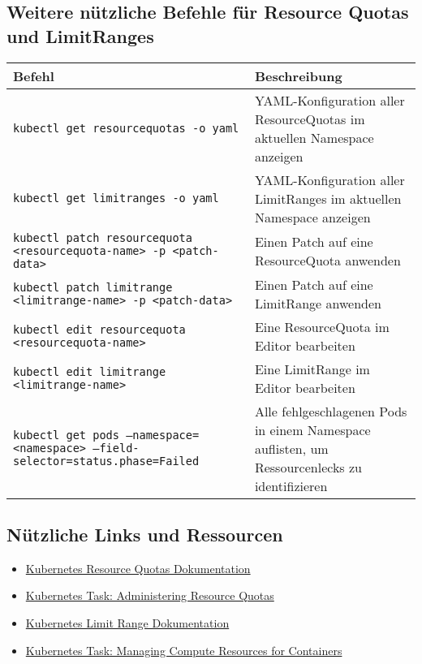 \subsection{Weitere nützliche Befehle für Resource Quotas und LimitRanges}
\begin{tabular}{|p{}|p{}|}
\hline
\textbf{Befehl} & \textbf{Beschreibung} \\
\hline
\texttt{kubectl get resourcequotas -o yaml} & YAML-Konfiguration aller ResourceQuotas im aktuellen Namespace anzeigen \\
\texttt{kubectl get limitranges -o yaml} & YAML-Konfiguration aller LimitRanges im aktuellen Namespace anzeigen \\
\texttt{kubectl patch resourcequota <resourcequota-name> -p <patch-data>} & Einen Patch auf eine ResourceQuota anwenden \\
\texttt{kubectl patch limitrange <limitrange-name> -p <patch-data>} & Einen Patch auf eine LimitRange anwenden \\
\texttt{kubectl edit resourcequota <resourcequota-name>} & Eine ResourceQuota im Editor bearbeiten \\
\texttt{kubectl edit limitrange <limitrange-name>} & Eine LimitRange im Editor bearbeiten \\
\texttt{kubectl get pods --namespace=<namespace> --field-selector=status.phase=Failed} & Alle fehlgeschlagenen Pods in einem Namespace auflisten, um Ressourcenlecks zu identifizieren \\
\hline
\end{tabular}

\subsection*{Nützliche Links und Ressourcen}
\begin{itemize}
    \item \href{https://kubernetes.io/docs/concepts/policy/resource-quotas/}{Kubernetes Resource Quotas Dokumentation}
    \item \href{https://kubernetes.io/docs/tasks/administer-cluster/quota-api-object/}{Kubernetes Task: Administering Resource Quotas}
    \item \href{https://kubernetes.io/docs/concepts/policy/limit-range/}{Kubernetes Limit Range Dokumentation}
    \item \href{https://kubernetes.io/docs/tasks/administer-cluster/manage-resources/memory-default-namespace/}{Kubernetes Task: Managing Compute Resources for Containers}
\end{itemize}



